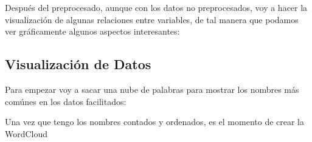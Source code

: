 \documentclass[]{article}
\newenvironment{Shaded}{\begin{snugshade}}{\end{snugshade}}
\newcommand{\CommentTok}[1]{\textcolor[rgb]{0.56,0.35,0.01}{\textit{#1}}}
\newcommand{\DataTypeTok}[1]{\textcolor[rgb]{0.13,0.29,0.53}{#1}}
\newcommand{\DecValTok}[1]{\textcolor[rgb]{0.00,0.00,0.81}{#1}}
\newcommand{\FloatTok}[1]{\textcolor[rgb]{0.00,0.00,0.81}{#1}}
\newcommand{\KeywordTok}[1]{\textcolor[rgb]{0.13,0.29,0.53}{\textbf{#1}}}
\newcommand{\NormalTok}[1]{#1}
\newcommand{\OperatorTok}[1]{\textcolor[rgb]{0.81,0.36,0.00}{\textbf{#1}}}
\newcommand{\OtherTok}[1]{\textcolor[rgb]{0.56,0.35,0.01}{#1}}
\newcommand{\StringTok}[1]{\textcolor[rgb]{0.31,0.60,0.02}{#1}}
\begin{document}
Después del preprocesado, aunque con los datos no preprocesados, voy a
hacer la visualización de algunas relaciones entre variables, de tal
manera que podamos ver gráficamente algunos aspectos interesantes:

\hypertarget{visualizacion-de-datos}{%
\subsection{Visualización de Datos}\label{visualizacion-de-datos}}

Para empezar voy a sacar una nube de palabras para mostrar los nombres
más comúnes en los datos facilitados:

\begin{Shaded}
\end{Shaded}

Una vez que tengo los nombres contados y ordenados, es el momento de
crear la WordCloud

\begin{Shaded}
\end{Shaded}
\end{document}
